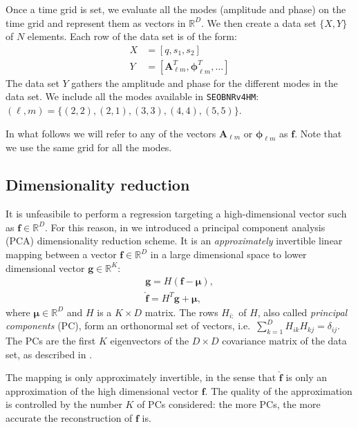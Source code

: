 \documentclass[twocolumn,showpacs,preprintnumbers,nofootinbib,prd,
superscriptaddress,10pt]{revtex4-1}
\newcommand{\R}{\mathbb{R}}
\begin{document}
Once a time grid is set, we evaluate all the modes (amplitude and phase) on the time grid and represent them as vectors in $\R^D$.
We then create a data set $\{X, Y\}$ of $N$ elements. Each row of the data set is of the form:
\begin{align}
	X &= [q, s_1, s_2] \\
	Y &= [\boldsymbol{A}^T_{\ell m}, \boldsymbol{\phi}^T_{\ell m}, \hdots ] 
\end{align}
%
The data set $Y$ gathers the amplitude and phase for the different modes in the data set.
We include all the modes available in \texttt{SEOBNRv4HM}: $(\ell, m) = \{(2,2),(2,1), (3,3), (4,4), (5,5)\}$.

In what follows we will refer to any of the vectors $\boldsymbol{A}_{\ell m}$ or $\boldsymbol{\phi}_{\ell m}$ as $\boldsymbol{f}$.
Note that we use the same grid for all the modes.

\subsection{Dimensionality reduction}
\label{sec:PCA}

It is unfeasibile to perform a regression targeting a high-dimensional vector such as $\boldsymbol{f} \in \R^D$. 
For this reason, in \cite{Schmidt:2020yuu} we introduced a principal component analysis (PCA) dimensionality 
reduction scheme.
It is an {\it approximately} invertible linear mapping between a vector $\boldsymbol{f} \in \R^D$ in a large dimensional space to lower dimensional vector  $\boldsymbol{g} \in \R^K$:
%
\begin{align}
	\mathbf{g} = H (\mathbf{f} - \boldsymbol{\mu}) \label{eq:PCA_reduction_model},\\
	\hat{\mathbf{f}} = H^T \mathbf{g} + \boldsymbol{\mu}, \label{eq:PCA_reconstruction_model}
\end{align}
where $\boldsymbol{\mu} \in \R^D$ and $H$ is a $K \times D$ matrix.
The rows $H_{i:}$ of $H$, also called {\it principal components} (PC), form an orthonormal set of vectors, 
i.e.~${\sum_{k=1}^D H_{ik} H_{kj} = \delta_{ij}}$.
The PCs are the first $K$ eigenvectors of the $D \times D$ covariance matrix of the data set, as described in 
\cite[Sec. 12]{murphy2012machine}.

The mapping is only approximately invertible, in the sense that $\hat{\mathbf{f}}$ is only an approximation of the high dimensional vector $\mathbf{f}$. The quality of the approximation is controlled by the number $K$ of PCs considered: the more PCs, the more accurate the reconstruction of $\mathbf{f}$ is.
\end{document}
